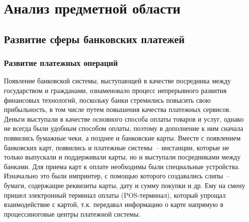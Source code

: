 \newpage




\section{Анализ предметной области}

\subsection{Развитие сферы банковских платежей}

\subsubsection{Развитие платежных операций}

Появление банковской системы, выступающей в качестве посредника между государством и гражданами, ознаменовало процесс непрерывного развития финансовых технологий, поскольку банки стремились повысить свою прибыльность, в том числе путем повышения качества платежных сервисов.
Деньги выступали в качестве основного способа оплаты товаров и услуг, однако не всегда были удобным способом оплаты, поэтому в дополнение к ним сначала появились бумажные чеки, а позднее и банковские карты.
Вместе с появлением банковских карт, появились и платежные системы~-- инстанции, которые не только выпускали и поддерживали карты, но и выступали посредниками между банками.
Для приема карт к оплате необходимы были специальные устройства.
Изначально это были импринтер, с помощью которого создавались слипы~-- бумаги, содержащие реквизиты карты, дату и сумму покупки и др.
Ему на смену пришел электронный терминал оплаты (POS-терминал), который упрощал взаимодействие с картой, т.к. передавал информацию о карте напрямую в процессиноговые центры платежной системы.

